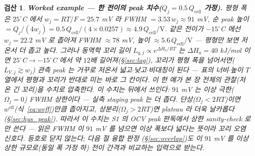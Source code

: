 \documentclass[11pt,a4paper]{article}
\newtheorem*{verifybox}{검산}
\newcommand{\eff}{\mathrm{eff}}
\newcommand{\cell}{\mathrm{cell}}
\begin{document}
\begin{verifybox}
\textbf{Worked example — 한 전이의 peak 치수($Q_j=0.5\,Q_\cell$ 가정).} 평형 폭은 $25^\circ$C 에서
$w_j=RT/F=25.7$ mV 라 FWHM $=3.53\,w_j\approx91$ mV, 순 peak 높이 $=Q_j/(4w_j)=0.5\,Q_\cell/(4\times0.0257)
\approx4.9\,Q_\cell/\mathrm V$. 같은 전이가 $-15^\circ$C 에선 $w_j=22.2$ mV 로 좁아져 FWHM $\approx78$ mV, 높이
$\approx5.6\,Q_\cell/\mathrm V$ — \emph{평형만 보면 저온서 더 좁고 높다}. 그러나 동역학 꼬리 길이 $L_{q,j}\propto
e^{\Delta H_a/RT}$ 는 $\Delta H_a=40$ kJ/mol 이면 $25^\circ$C$\to-15^\circ$C 에서 약 $12$배 길어져(\S\ref{sec:lag}),
꼬리가 평형 폭을 넘어서면($L_{V,j}\gtrsim w_j$) 관측 peak 는 거꾸로 \emph{저온서 넓고$\cdot$낮고$\cdot$비대칭}이
된다 — 표의 너비$\cdot$높이 $T$ 열에서 평형과 꼬리가 반대로 미는 바로 그 칸이다. 이 한 예가 본 장 전체의
관찰(저온 긴 꼬리)을 수치로 압축한다. \emph{이 수치는 뒤에서 쓰인다}: $91$ mV 는 \emph{이상 극한($\Omega_j=0$) FWHM
상한}이다 — 실측 staging peak 는 더 좁다. 단상($\Omega_j<2RT$)이면 $w^\eff$(식~\eqref{eq:weff})만큼 좁아지고,
상분리($\Omega_j>2RT$)면 plateau 라 더욱 날카롭다(\S\ref{sec:hys_peak}). 따라서 이 수치는 S1 의 OCV peak
판독에서 상한 sanity-check 로만 쓴다 — 읽은 FWHM 이 $91$ mV 를 넘으면 이상 폭보다 넓다는 뜻이라 꼬리 오염
신호다. 등호로 닫지 않는다; 다음 절 융합 판정
(\S\ref{sec:overlap})도 이 $91$ mV 를 \emph{이상 상한 규모}로(동일 폭 가정 하) 전이 간격과 비교하는 입력으로 받는다.
\end{verifybox}
\end{document}
